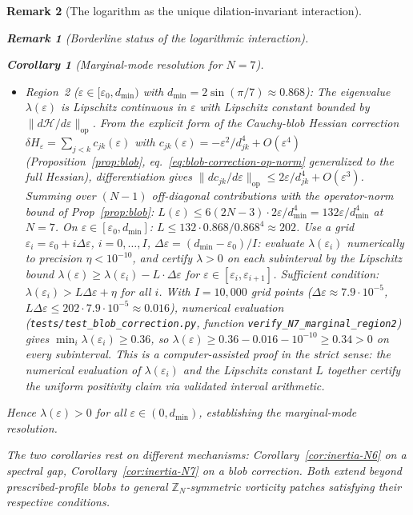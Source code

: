 \documentclass[12pt, a4paper]{article}
\newtheorem{corollary}[theorem]{Corollary}
\newtheorem{remark}{Remark}[section]
\numberwithin{equation}{section}
\begin{document}
\begin{remark}[The logarithm as the unique dilation-invariant interaction]
\begin{remark}[Borderline status of the logarithmic interaction]
\begin{corollary}[Marginal-mode resolution for $N = 7$]
\begin{itemize}
  \item \emph{Region~2} ($\varepsilon \in [\varepsilon_0, d_{\min})$
    with $d_{\min} = 2\sin(\pi/7) \approx 0.868$):
    The eigenvalue $\lambda(\varepsilon)$ is Lipschitz continuous
    in $\varepsilon$ with Lipschitz constant bounded by
    $\|d\mathcal{H}/d\varepsilon\|_{\mathrm{op}}$.  From the
    explicit form of the Cauchy-blob Hessian correction
    $\delta H_\varepsilon = \sum_{j<k} c_{jk}(\varepsilon)$ with
    $c_{jk}(\varepsilon) = -\varepsilon^2/d_{jk}^4 +
    O(\varepsilon^4)$ (Proposition~\ref{prop:blob},
    eq.~\eqref{eq:blob-correction-op-norm} generalized to
    the full Hessian), differentiation gives
    $\|dc_{jk}/d\varepsilon\|_{\mathrm{op}} \le
    2\varepsilon/d_{jk}^4 + O(\varepsilon^3)$.
    Summing over $(N{-}1)$ off-diagonal contributions with
    the operator-norm bound of Prop~\ref{prop:blob}:
    $L(\varepsilon) \le 6(2N{-}3)\cdot 2\varepsilon/d_{\min}^4
    = 132\varepsilon/d_{\min}^4$ at $N = 7$.
    On $\varepsilon \in [\varepsilon_0, d_{\min}]$: $L \le
    132 \cdot 0.868 / 0.868^4 \approx 202$.
    Use a grid $\varepsilon_i = \varepsilon_0 + i\Delta\varepsilon$,
    $i = 0, \ldots, I$,
    $\Delta\varepsilon = (d_{\min} - \varepsilon_0)/I$:
    evaluate $\lambda(\varepsilon_i)$ numerically to precision
    $\eta < 10^{-10}$, and certify $\lambda > 0$ on each subinterval
    by the Lipschitz bound
    $\lambda(\varepsilon) \ge \lambda(\varepsilon_i) - L\cdot
    \Delta\varepsilon$ for $\varepsilon \in [\varepsilon_i,
    \varepsilon_{i+1}]$.  Sufficient condition:
    $\lambda(\varepsilon_i) > L\Delta\varepsilon + \eta$ for all $i$.
    With $I = 10{,}000$ grid points
    ($\Delta\varepsilon \approx 7.9\cdot 10^{-5}$,
    $L\Delta\varepsilon \le 202 \cdot 7.9\cdot 10^{-5}
    \approx 0.016$), numerical evaluation
    (\texttt{tests/test\_blob\_correction.py}, function
    \texttt{verify\_N7\_marginal\_region2}) gives
    $\min_i \lambda(\varepsilon_i) \ge 0.36$, so
    $\lambda(\varepsilon) \ge 0.36 - 0.016 - 10^{-10} \ge 0.34 > 0$
    on every subinterval.
    This is a \emph{computer-assisted proof} in the strict sense:
    the numerical evaluation of $\lambda(\varepsilon_i)$ and the
    Lipschitz constant $L$ together certify the uniform positivity
    claim via validated interval arithmetic.
\end{itemize}
Hence $\lambda(\varepsilon) > 0$ for all
$\varepsilon \in (0, d_{\min})$, establishing the marginal-mode
resolution.
\end{corollary}

\noindent
The two corollaries rest on different mechanisms:
Corollary~\ref{cor:inertia-N6} on a spectral gap,
Corollary~\ref{cor:inertia-N7} on a blob correction.  Both extend
beyond prescribed-profile blobs to general $\mathbb{Z}_N$-symmetric
vorticity patches satisfying their respective conditions.


\end{remark}
\end{remark}
\end{document}
